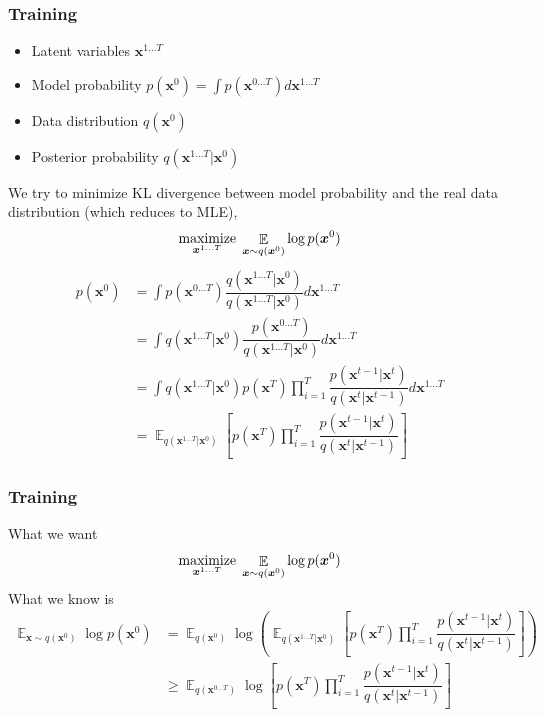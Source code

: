 \documentclass[10pt,xcolor={usenames,dvipsnames,table}]{beamer}
\begin{document}
\begin{frame}
    \frametitle{Training}
    \begin{itemize}
        \item Latent variables $\bm{x}^{1\ldots T}$
        \item Model probability  $p(\bm{x}^{0}) = \int p(\bm{x}^{0\ldots T}) d\bm{x}^{1\ldots T}$
        \item Data distribution $q(\bm{x}^{0})$
        \item Posterior probability $q(\bm{x}^{1\ldots T} | \bm{x}^{0})$
    \end{itemize}
    We try to minimize KL divergence between model probability and the real data distribution (which reduces to MLE), 
    \[
    \operatorname*{maximize}_{\bm{x}^{1\ldots T}}\; \mathop{\mathbb{E}}_{\bm{x} \sim q(\bm{x}^{0})} \log p(\bm{x}^{0})
    \] 
    \begin{align*}
    p(\bm{x}^{0})
    &= \int p(\bm{x}^{0\ldots T}) \dfrac{q(\bm{x}^{1\ldots T}|\bm{x}^{0})}{q(\bm{x}^{1\ldots T}|\bm{x}^{0})} d \bm{x}^{1\ldots T}\\
    &= \int q(\bm{x}^{1\ldots T}|\bm{x}^{0}) \dfrac{p(\bm{x}^{0\ldots T})}{q(\bm{x}^{1\ldots T}|\bm{x}^{0})} d \bm{x}^{1\ldots T}\\
    &= \int q(\bm{x}^{1\ldots T}|\bm{x}^{0}) p(\bm{x}^{T}) \prod_{i=1}^{T}\dfrac{p(\bm{x}^{t-1}| \bm{x}^{t})}{q(\bm{x}^{t}|\bm{x}^{t-1})} d \bm{x}^{1\ldots T} \\
    &= \mathop{\mathbb{E}}_{q(\bm{x}^{1\ldots T}|\bm{x}^{0})} \left[  p(\bm{x}^{T}) \prod_{i=1}^{T}\dfrac{p(\bm{x}^{t-1}| \bm{x}^{t})}{q(\bm{x}^{t}|\bm{x}^{t-1})} \right]
    \end{align*}
\end{frame}

\begin{frame}
    \frametitle{Training}
    What we want
    \[
    \operatorname*{maximize}_{\bm{x}^{1\ldots T}}\; \mathop{\mathbb{E}}_{\bm{x} \sim q(\bm{x}^{0})} \log p(\bm{x}^{0})
    \] 
    What we know is
    \begin{align*}
    \mathop{\mathbb{E}}_{\bm{x} \sim q(\bm{x}^{0})} \log p(\bm{x}^{0})
    &= \mathop{\mathbb{E}}_{q(\bm{x}^{0})} \log \left( \mathop{\mathbb{E}}_{q(\bm{x}^{1\ldots T}|\bm{x}^{0})} \left[  p(\bm{x}^{T}) \prod_{i=1}^{T}\dfrac{p(\bm{x}^{t-1}| \bm{x}^{t})}{q(\bm{x}^{t}|\bm{x}^{t-1})} \right]
 \right) \\
    &\geq \mathop{\mathbb{E}}_{q(\bm{x}^{0\ldots T})} \log \left[  p(\bm{x}^{T}) \prod_{i=1}^{T}\dfrac{p(\bm{x}^{t-1}| \bm{x}^{t})}{q(\bm{x}^{t}|\bm{x}^{t-1})} \right]
    \end{align*}
\end{frame}
\end{document}
